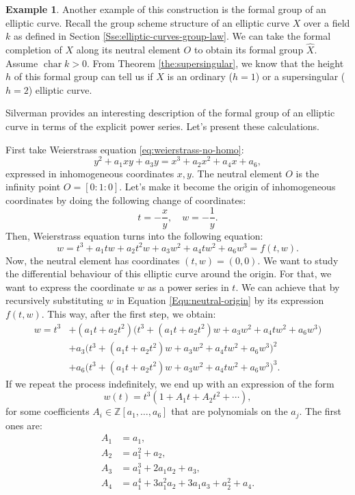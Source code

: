 \documentclass{report}
\DeclareMathOperator{\chara}{char}
\theoremstyle{definition}
\newtheorem{example}[theorem]{Example}
\begin{document}
\begin{example}
Another example of this construction is the formal group of an elliptic curve. Recall the group scheme structure of an elliptic curve $X$ over a field $k$ as defined in Section \ref{Sse:elliptic-curves-group-law}. We can take the formal completion of $X$ along its neutral element $O$ to obtain its formal group $\widehat{X}$. Assume $\chara k>0$. From Theorem \ref{the:supersingular}, we know that the height $h$ of this formal group can tell us if $X$ is an ordinary ($h=1$) or a supersingular ($h=2$) elliptic curve.

Silverman \cite[Section~IV.1]{silverman2009arithmetic} provides an interesting description of the formal group of an elliptic curve in terms of the explicit power series. Let's present these calculations.

First take Weierstrass equation \eqref{eq:weierstrass-no-homo}:
\[y^2+a_1xy+a_3y=x^3+a_2x^2+a_4x+a_6,\]
expressed in inhomogeneous coordinates $x,y$. The neutral element $O$ is the infinity point $O=[0:1:0]$. Let's make it become the origin of inhomogeneous coordinates by doing the following change of coordinates:
\[t=-\frac{x}{y},\quad w=-\frac{1}{y}.\]
Then, Weierstrass equation turns into the following equation:
\begin{equation}
\label{Equ:neutral-origin}
w=t^3+a_1tw+a_2t^2w+a_3w^2+a_4tw^2+a_6w^3=f(t,w).
\end{equation}
Now, the neutral element has coordinates $(t,w)=(0,0)$. We want to study the differential behaviour of this elliptic curve around the origin. For that, we want to express the coordinate $w$ as a power series in $t$. We can achieve that by recursively substituting $w$ in Equation \eqref{Equ:neutral-origin} by its expression $f(t,w)$. This way, after the first step, we obtain:
\begin{align*}
w=t^3&+(a_1t+a_2t^2)\big(t^3+(a_1t+a_2t^2)w+a_3w^2+a_4tw^2+a_6w^3\big)\\
&+a_3\big(t^3+(a_1t+a_2t^2)w+a_3w^2+a_4tw^2+a_6w^3\big)^2\\
&+a_6\big(t^3+(a_1t+a_2t^2)w+a_3w^2+a_4tw^2+a_6w^3\big)^3.
\end{align*}
If we repeat the process indefinitely, we end up with an expression of the form
\[w(t)=t^3(1+A_1t+A_2t^2+\cdots),\]
for some coefficients $A_i\in\mathbb{Z}[a_1,\ldots,a_6]$ that are polynomials on the $a_j$. The first ones are:
\begin{align*}
A_1&=a_1,\\
A_2&=a_1^2+a_2,\\
A_3&=a_1^3+2a_1a_2+a_3,\\
A_4&=a_1^4+3a_1^2a_2+3a_1a_3+a_2^2+a_4.
\end{align*}


\end{example}
\end{document}
